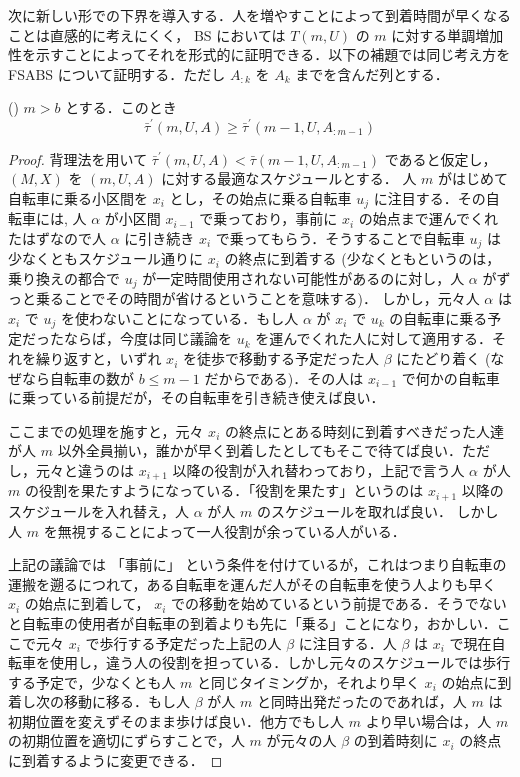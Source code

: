 次に新しい形での下界を導入する．人を増やすことによって到着時間が早くなることは直感的に考えにくく， BS においては $T(m, U)$ の $m$ に対する単調増加性を示すことによってそれを形式的に証明できる．以下の補題では同じ考え方を FSABS について証明する．ただし $A_{:k}$ を $A_k$ までを含んだ列とする．

\begin{lemma}\label{lemma:fsabs-lower-bound-recursive}
  ({\color{red}{補題 or 定理？}}) $m > b$ とする．このとき
  \begin{equation}
    \bar\tau^{\prime}(m, U, A) \geq \bar\tau^\prime(m - 1, U, A_{:m-1})
  \end{equation}
\end{lemma}
\begin{proof}
  背理法を用いて $\bar\tau^{\prime}(m, U, A) < \bar\tau(m - 1, U, A_{:m-1})$ であると仮定し，$(M, X)$ を $(m, U, A)$ に対する最適なスケジュールとする．
  人 $m$ がはじめて自転車に乗る小区間を $x_i$ とし，その始点に乗る自転車 $u_j$ に注目する．その自転車には,
  人 $\alpha$ が小区間 $x_{i - 1}$ で乗っており，事前に $x_i$ の始点まで運んでくれたはずなので人 $\alpha$ に引き続き $x_i$ で乗ってもらう．そうすることで自転車 $u_j$ は少なくともスケジュール通りに $x_i$ の終点に到着する (少なくともというのは，乗り換えの都合で $u_j$ が一定時間使用されない可能性があるのに対し，人 $\alpha$ がずっと乗ることでその時間が省けるということを意味する)． しかし，元々人 $\alpha$ は $x_i$ で $u_j$ を使わないことになっている．もし人 $\alpha$ が $x_i$ で $u_k$ の自転車に乗る予定だったならば，今度は同じ議論を $u_k$ を運んでくれた人に対して適用する．それを繰り返すと，いずれ $x_i$ を徒歩で移動する予定だった人 $\beta$ にたどり着く (なぜなら自転車の数が $b \leq m - 1$ だからである)．その人は $x_{i - 1}$ で何かの自転車に乗っている前提だが，その自転車を引き続き使えば良い．

ここまでの処理を施すと，元々 $x_i$ の終点にとある時刻に到着すべきだった人達が人 $m$ 以外全員揃い，誰かが早く到着したとしてもそこで待てば良い．ただし，元々と違うのは $x_{i + 1}$ 以降の役割が入れ替わっており，上記で言う人 $\alpha$ が人 $m$ の役割を果たすようになっている．「役割を果たす」というのは $x_{i + 1}$ 以降のスケジュールを入れ替え，人 $\alpha$ が人 $m$ のスケジュールを取れば良い． しかし人 $m$ を無視することによって一人役割が余っている人がいる．

上記の議論では 「事前に」 という条件を付けているが，これはつまり自転車の運搬を遡るにつれて，ある自転車を運んだ人がその自転車を使う人よりも早く $x_i$ の始点に到着して， $x_i$ での移動を始めているという前提である．そうでないと自転車の使用者が自転車の到着よりも先に「乗る」ことになり，おかしい．ここで元々 $x_i$ で歩行する予定だった上記の人 $\beta$ に注目する．人 $\beta$ は $x_i$ で現在自転車を使用し，違う人の役割を担っている．しかし元々のスケジュールでは歩行する予定で，少なくとも人 $m$ と同じタイミングか，それより早く $x_i$ の始点に到着し次の移動に移る．もし人 $\beta$ が人 $m$ と同時出発だったのであれば，人 $m$ は初期位置を変えずそのまま歩けば良い．他方でもし人 $m$ より早い場合は，人 $m$ の初期位置を適切にずらすことで，人 $m$ が元々の人 $\beta$ の到着時刻に $x_i$ の終点に到着するように変更できる．


\end{proof}
